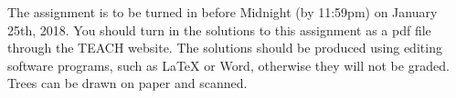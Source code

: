 \documentclass[11pt]{article}
\begin{document}
\raggedright
\newcommand\NAME{Thomas Noelcke}  %
\newcommand\ANDREWID{noelcket}     %
\newcommand\HWNUM{2}              %


The assignment is to be turned in before Midnight (by 11:59pm) on January 25th, 2018. 
You should turn in the solutions to this assignment as a pdf file through the TEACH website.
The solutions should be produced using editing software programs, such as LaTeX or Word, otherwise they will not be graded.
Trees can be drawn on paper and scanned.
\end{document}
